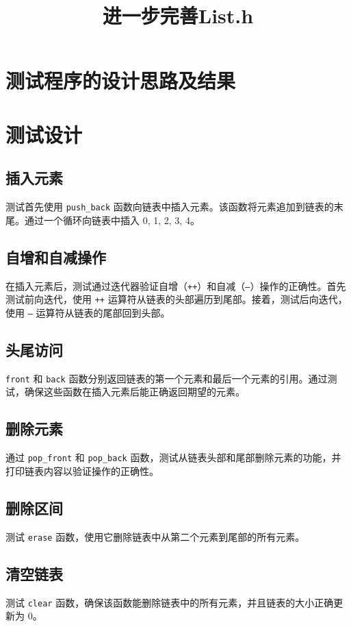 \documentclass[UTF8]{ctexart}
\begin{document}
\title{进一步完善List.h}

\pagestyle{fancy}
\fancyhead{}

\section*{测试程序的设计思路及结果}
\section{测试设计}
\subsection{插入元素}
测试首先使用 \texttt{push\_back} 函数向链表中插入元素。该函数将元素追加到链表的末尾。通过一个循环向链表中插入 0, 1, 2, 3, 4。

\subsection{自增和自减操作}
在插入元素后，测试通过迭代器验证自增（\texttt{++}）和自减（\texttt{--}）操作的正确性。首先测试前向迭代，使用 \texttt{++} 运算符从链表的头部遍历到尾部。接着，测试后向迭代，使用 \texttt{--} 运算符从链表的尾部回到头部。

\subsection{头尾访问}
\texttt{front} 和 \texttt{back} 函数分别返回链表的第一个元素和最后一个元素的引用。通过测试，确保这些函数在插入元素后能正确返回期望的元素。

\subsection{删除元素}
通过 \texttt{pop\_front} 和 \texttt{pop\_back} 函数，测试从链表头部和尾部删除元素的功能，并打印链表内容以验证操作的正确性。

\subsection{删除区间}
测试 \texttt{erase} 函数，使用它删除链表中从第二个元素到尾部的所有元素。

\subsection{清空链表}
测试 \texttt{clear} 函数，确保该函数能删除链表中的所有元素，并且链表的大小正确更新为 0。
\end{document}
